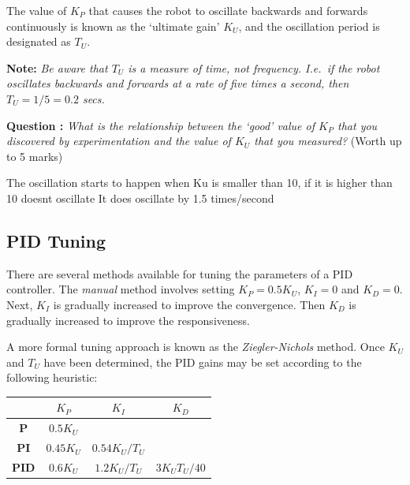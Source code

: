 \documentclass[hidelinks,a4paper,11pt]{article}
\newcounter{question}
\newcommand\myq{\refstepcounter{question}\thequestion}
\begin{document}
The value of $K_P$ that causes the robot to oscillate backwards and forwards continuously is known as the `ultimate gain' $K_U$, and the oscillation period is designated as $T_U$.

{\bfseries Note:}  \emph{Be aware that $T_U$ is a measure of time, not frequency.  I.e.\ if the robot oscillates backwards and forwards at a rate of five times a second, then $T_U=1/5=0.2$ secs.}

{\bfseries Question \myq:}  \emph{What is the relationship between the `good' value of $K_P$ that you discovered by experimentation and the value of $K_U$ that you measured?} (Worth up to 5 marks)\\
\begin{mdframed}

The oscillation starts to happen when Ku is smaller than 10, if it is higher than 10 doesnt oscillate
It does oscillate by 1.5 times/second
\end{mdframed}
\vspace*{\baselineskip}


\subsection {PID Tuning}

There are several methods available for tuning the parameters of a PID controller.  The \emph{manual} method involves setting $K_P=0.5K_U$, $K_I=0$ and $K_D=0$.  Next, $K_I$ is gradually increased to improve the convergence.  Then $K_D$ is gradually increased to improve the responsiveness.

A more formal tuning approach is known as the \emph{Ziegler-Nichols} method.  Once $K_U$ and $T_U$ have been determined, the PID gains may be set according to the following heuristic:
\begin{center}
	\begin{tabular}{ | c | c | c | c | } \hline
		 & \bf{$K_P$} & \bf{$K_I$} & \bf{$K_D$} \\ \hline
		\bf{P} & $0.5K_U$ &  &  \\ \hline
		\bf{PI} & $0.45K_U$ & $0.54K_U/T_U$ &  \\ \hline
		\bf{PID} & $0.6K_U$ & $1.2K_U/T_U$ & $3K_UT_U/40$ \\ \hline
	\end{tabular}
\end{center}
\vspace*{\baselineskip}
\end{document}
